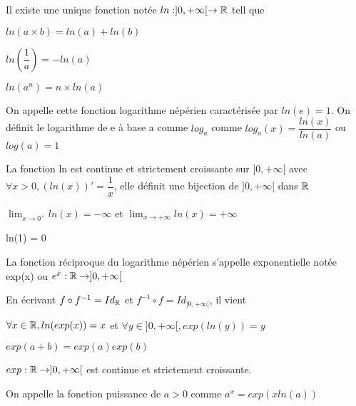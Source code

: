 \documentclass[a4paper, 12pt]{article}
\begin{document}
\begin{definition}
    Il existe une unique fonction notée $ln : ]0, +\infty[ \rightarrow \mathbb{R}$ tell que
    \item $ln(a \times b) = ln(a) + ln(b)$
    \item $ln(\dfrac{1}{a}) = -ln(a)$
    \item $ln(a^n) = n\times ln(a)$
    
    \item On appelle cette fonction logarithme népérien caractérisée par $ln(e) = 1$.
    On définit le logarithme de e à base a comme $log_a$ comme $log_a(x) = \dfrac{ln(x)}{ln(a)}$ ou $log(a) = 1$
\end{definition}

\begin{proprietes}
    La fonction ln est continue et strictement croissante sur $]0, +\infty[$ avec
    $\forall x \gt 0, (ln (x))' = \dfrac{1}{x}$, elle définit une bijection de $]0, +\infty[$ dans $\mathbb{R}$

    \item $\lim_{x \to 0^+} ln(x) = - \infty$ et $\lim_{x \to +\infty} ln(x) = +\infty$
    \item ln(1) = 0
\end{proprietes}

\begin{definition}
    La fonction réciproque du logarithme népérien s'appelle exponentielle notée exp(x) ou $e^x: \mathbb{R} \rightarrow ]0, +\infty[$
\end{definition}

\begin{proprietes}
    En écrivant $f \circ f^{-1} = Id_{\mathbb{R}}$ et $f^{-1} \circ f = Id_{]0, +\infty[}$, il vient
    \item $\forall x \in \mathbb{R}, ln(exp(x)) = x$ et $\forall y \in ]0, +\infty[, exp(ln(y))=y$
    \item $exp(a + b) = exp(a) exp(b)$
    \item $exp: \mathbb{R} \rightarrow ]0, +\infty[$ est continue et strictement croissante.
\end{proprietes}

\begin{definition}
    On appelle la fonction puissance de $a \gt 0$ comme $a^x = exp(x ln(a))$
\end{definition}
\end{document}
